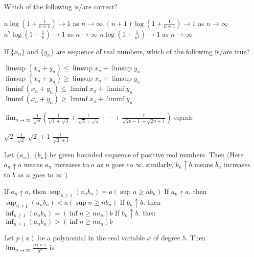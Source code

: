 \documentclass[10pt]{exam}
\begin{document}
\begin{questions}
\question
Which of the following is/are correct?

\begin{checkboxes}
\choice $n \log(1+ \frac{1}{n+1}) \rightarrow 1$ as $n \rightarrow \infty$
\choice $(n+1) \log(1+ \frac{1}{n+1}) \rightarrow 1$ as $n \rightarrow \infty$
\choice $n^2 \log(1+ \frac{1}{n}) \rightarrow 1$ as $n \rightarrow \infty$
\choice $n \log(1+ \frac{1}{n^2}) \rightarrow 1$ as $n \rightarrow \infty$
\end{checkboxes}

\question
If $\{x_n \}$ and $\{y_n \}$ are sequence of real numbers, which of the following is/are true?

\begin{checkboxes}
\choice $\limsup (x_n+y_n) \leq \limsup x_n + \limsup y_n$
\choice $\limsup (x_n+y_n) \geq \limsup x_n + \limsup y_n$
\choice $\liminf (x_n+y_n) \leq \liminf x_n + \liminf y_n$
\choice $\liminf (x_n+y_n) \geq \liminf x_n + \liminf y_n$
\end{checkboxes}

\question 
$\lim_{n \rightarrow \infty} \frac{1}{\sqrt{n}}(\frac{1}{\sqrt{1} + \sqrt{3}} + \frac{1}{\sqrt{3} + \sqrt{5}} + \cdots + \frac{1}{\sqrt{2n - 1} + \sqrt{2n + 1}})$ equals 

\begin{oneparchoices}
\choice $\sqrt{2}$
\choice $\frac{1}{\sqrt{2}}$
\choice $\sqrt{2} + 1$
\choice $\frac{1}{\sqrt{2} + 1 }$
\end{oneparchoices}

\question 
Let $\{a_n\}$, $\{b_n\}$ be given bounded sequence of positive real numbers. Then (Here $a_n \uparrow a $ means $a_n$ increases to $a$ as $n$ goes to $\infty $, similarly, $b_n \uparrow b $ means $b_n$ increases to $b$ as $n$ goes to $\infty $ )

\begin{checkboxes}
\choice If $a_n \uparrow a $, then $\sup_{n \geq 1}(a_n b_n) = a(\sup{n \geq n} b_n)$
\choice If $a_n \uparrow a $, then $\sup_{n \geq 1}(a_n b_n) < a(\sup{n \geq n} b_n)$
\choice If $b_n \uparrow b $, then $\inf_{n \geq 1}(a_n b_n) = (\inf{n \geq n} a_n)b$
\choice If $b_n \uparrow b $, then $\inf_{n \geq 1}(a_n b_n) > (\inf{n \geq n} a_n)b$
\end{checkboxes}

\question 
Let $p(x)$ be a polynomial in the real variable $x$ of degree $5$. Then $\lim_{n\rightarrow \infty} \frac{p(n)}{2^n} $ is 


\end{questions}
\end{document}

